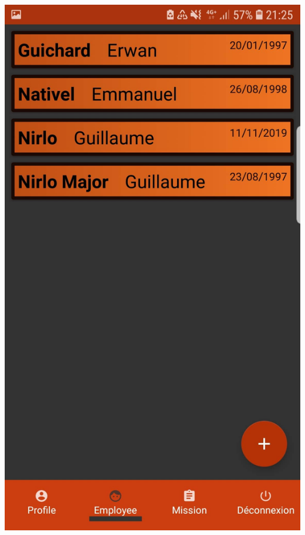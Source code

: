 \documentclass{article}
\begin{document}
\begin{center}
    \includegraphics[scale=0.1]{listeE.jpg}

\end{center}
\end{document}
